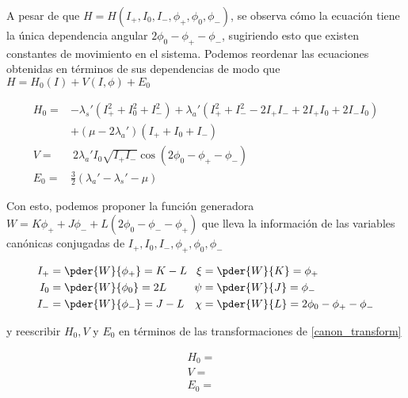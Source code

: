 A pesar de que $H = H(I_+,I_0,I_-,\phi_+,\phi_0,\phi_-)$, se observa cómo la ecuación tiene la única dependencia angular $2\phi_0 - \phi_+ - \phi_-$, sugiriendo esto que existen constantes de movimiento en el sistema. Podemos reordenar las ecuaciones obtenidas en términos de sus dependencias de modo que $H = H_0(I) + V(I,\phi) + E_0$

\begin{align}
H_0 =& - \lambda_s'\left( I_+^2 + I_0^2 + I_-^2 \right) + \lambda_a' \left( I_+^2 + I_-^2 - 2I_+I_- + 2I_+I_0 + 2I_-I_0 \right) \\
&+  (\mu - 2\lambda_a')\left(I_+ + I_0 + I_-\right) \\
V =& \ 2 \lambda_a' I_0 \sqrt{I_+I_-} \cos{(2\phi_0 - \phi_+ - \phi_-)} \\
E_0 =& \frac{3}{2}\left( \lambda_a' - \lambda_s' - \mu \right)
\end{align}

Con esto, podemos proponer la función generadora $W=K\phi_+ + J\phi_- + L(2\phi_0 - \phi_- - \phi_+)$ que lleva la información de las variables canónicas conjugadas de  $I_+,I_0,I_-,\phi_+,\phi_0,\phi_-$

\begin{equation}
\begin{aligned}[c]
I_+ &= \pder{W}{\phi_+} = K-L \\
I_0 &= \pder{W}{\phi_0} = 2L \\
I_- &= \pder{W}{\phi_-} = J-L 
\end{aligned}
\ \ 
\begin{aligned}[c]
\xi &= \pder{W}{K} = \phi_+ \\ 
\psi &= \pder{W}{J} = \phi_- \\
\chi  &= \pder{W}{L} = 2\phi_0 - \phi_+ - \phi_- 
\end{aligned}
\label{canon_transform}
\end{equation}

y reescribir $H_0, V$ y $E_0$ en términos de las transformaciones de \ref{canon_transform}

\begin{align}
H_0 =& \\
V =& \\ 
E_0 =& 
\end{align}





